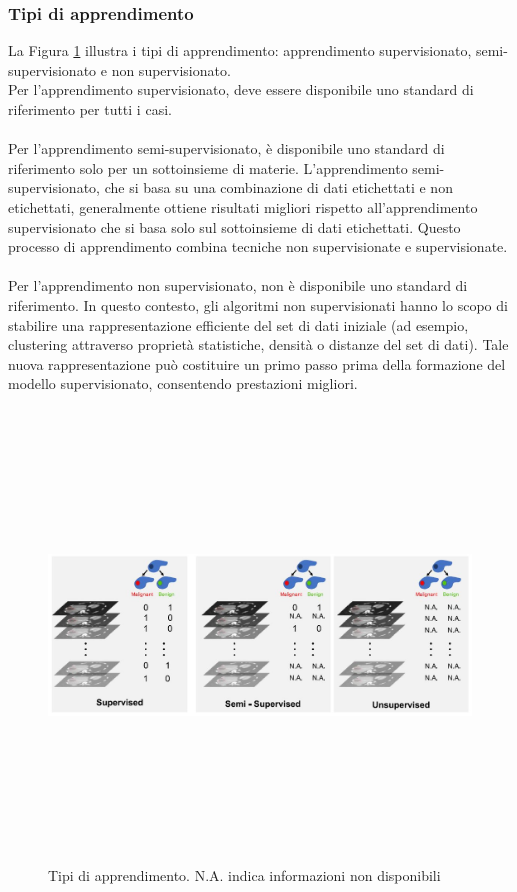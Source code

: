 \documentclass[12pt,a4paper]{report}
\begin{document}
\subsubsection{Tipi di apprendimento}
La Figura \ref{fig:type-of-learning} illustra i tipi di apprendimento: apprendimento supervisionato, semi-supervisionato e non supervisionato.\\
Per l'apprendimento supervisionato, deve essere disponibile uno standard di riferimento per tutti i casi.\\
\\
Per l'apprendimento semi-supervisionato, è disponibile uno standard di riferimento solo per un sottoinsieme di materie. L'apprendimento semi-supervisionato, che si basa su una combinazione di dati etichettati e non etichettati, generalmente ottiene risultati migliori rispetto all'apprendimento supervisionato che si basa solo sul sottoinsieme di dati etichettati. Questo processo di apprendimento combina tecniche non supervisionate e supervisionate.\\
\\
Per l'apprendimento non supervisionato, non è disponibile uno standard di riferimento. In questo contesto, gli algoritmi non supervisionati hanno lo scopo di stabilire una rappresentazione efficiente del set di dati iniziale (ad esempio, clustering attraverso proprietà statistiche, densità o distanze del set di dati). Tale nuova rappresentazione può costituire un primo passo prima della formazione del modello supervisionato, consentendo prestazioni migliori.\\

\begin{figure}[h!]
    \begin{center}
        \includegraphics[width=12cm,height=12cm,keepaspectratio]{Type-of-learning}
    \end{center}
    \caption{Tipi di apprendimento. N.A. indica informazioni non disponibili}
    \label{fig:type-of-learning}
\end{figure}
\end{document}
